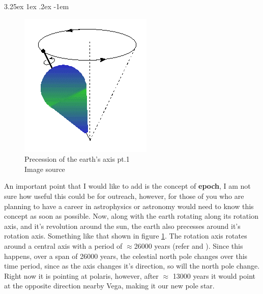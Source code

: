 \documentclass[a4paper,twoside,11pt]{article}
\makeatletter
\numberwithin{equation}{section}
\renewcommand\paragraph{\@startsection{paragraph}{5}{\z@}%
  {3.25ex \@plus1ex \@minus.2ex}%
  {-1em}%
  {\normalfont\normalsize\bfseries}}
\makeatother
\begin{document}
\paragraph{}
\begin{figure}
\begin{center}
\includegraphics[width=0.5\linewidth]{fig4.png} 
\caption{Precession of the earth's axis pt.1 \\ Image source \cite{precession1}}
\label{fig4}
\end{center}
\end{figure}
An important point that I would like to add is the concept of \textbf{epoch}, I am not sure how useful this could be for outreach, however, for those of you who are planning to have a career in astrophysics or astronomy would need to know this concept as soon as possible. Now, along with the earth rotating along its rotation axis, and it's revolution around the sun, the earth also precesses around it's rotation axis. Something like that shown in figure \ref{fig4}. The rotation axis rotates around a central axis with a period of $\approx$26000 years (refer \cite{precession1} and \cite{precession3}). Since this happens, over a span of 26000 years, the celestial north pole changes over this time period, since as the axis changes it's direction, so will the north pole change. Right now it is pointing at polaris, however, after $\approx$ 13000 years it would point at the opposite direction nearby Vega, making it our new pole star. 
\end{document}
